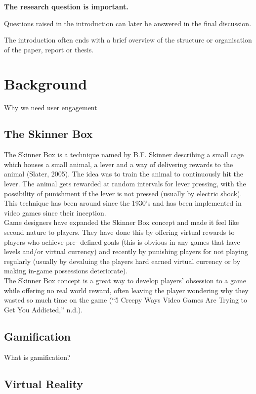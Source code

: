 \documentclass[a4,12pt]{article}
\newenvironment{boxit}{\begin{lrbox}{\savepar}
        \begin{minipage}[b]{4.6in}}
        {\end{minipage}\end{lrbox}\fbox{\usebox{\savepar}}}
\begin{document}
\begin{center}
\begin{boxit}
\textbf{The research question is important.}
\end{boxit}
\end{center}

Questions raised in the introduction can later be answered in the final discussion.

The introduction often ends with a brief overview of the structure or organisation of
the paper, report or thesis.

%
\section{Background}
Why we need user engagement
\subsection{The Skinner Box}
The Skinner Box is a technique named by B.F. Skinner describing a small cage which houses a small animal, a lever and a way of delivering rewards to the animal (Slater, 2005). The idea was to train the animal to continuously hit the lever. The animal gets rewarded at random intervals for lever pressing, with the possibility of punishment if the lever is not pressed (usually by electric shock). This technique has been around since the 1930’s and has been implemented in video games since their inception.
\\
Game designers have expanded the Skinner Box concept and made it feel like second nature to players. They have done this by offering virtual rewards to players who achieve pre- defined goals (this is obvious in any games that have levels and/or virtual currency) and recently by punishing players for not playing regularly (usually by devaluing the players hard earned virtual currency or by making in-game possessions deteriorate).
\\
The Skinner Box concept is a great way to develop players’ obsession to a game while offering no real world reward, often leaving the player wondering why they wasted so much time on the game \citep{QuinlanChalupMiddletonACRA2003}
(“5 Creepy Ways Video Games Are Trying to Get You Addicted,” n.d.).
\subsection{Gamification}
What is gamification?
\subsection{Virtual Reality}
\end{document}
